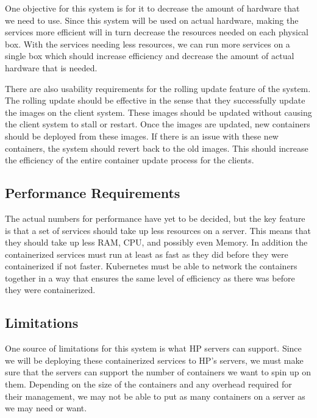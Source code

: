 \documentclass[onecolumn, draftclsnofoot,10pt, compsoc]{IEEEtran}
\begin{document}
One objective for this system is for it to decrease the amount of hardware that we need to use. Since this system will be used on actual hardware, making the services more efficient will in turn decrease the resources needed on each physical box. With the services needing less resources, we can run more services on a single box which should increase efficiency and decrease the amount of actual hardware that is needed. 

There are also usability requirements for the rolling update feature of the system. The rolling update should be effective in the sense that they successfully update the images on the client system. These images should be updated without causing the client system to stall or restart. Once the images are updated, new containers should be deployed from these images. If there is an issue with these new containers, the system should revert back to the old images. This should increase the efficiency of the entire container update process for the clients. 

\subsection{Performance Requirements}

The actual numbers for performance have yet to be decided, but the key feature is that a set of services should take up less resources on a server. This means that they should take up less RAM, CPU, and possibly even Memory. In addition the containerized services must run at least as fast as they did before they were containerized if not faster. Kubernetes must be able to network the containers together in a way that ensures the same level of efficiency as there was before they were containerized. 


\subsection{Limitations}

One source of limitations for this system is what HP servers can support. Since we will be deploying these containerized services to HP’s servers, we must make sure that the servers can support the number of containers we want to spin up on them. Depending on the size of the containers and any overhead required for their management, we may not be able to put as many containers on a server as we may need or want. 
\end{document}

